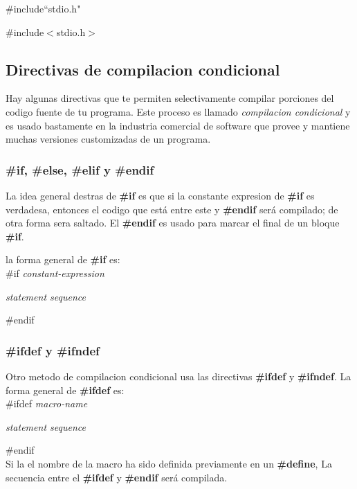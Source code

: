 \documentclass[]{article}
\begin{document}
			\#include``stdio.h"
			
			\#include$<$stdio.h$>$
			
		\subsection{Directivas de compilacion condicional}
		
		Hay algunas directivas que te permiten selectivamente compilar porciones del codigo fuente de tu programa. Este proceso es llamado \textit{compilacion condicional} y es usado bastamente en la industria comercial de software que provee y mantiene muchas versiones customizadas de un programa.
		
			\subsubsection{\#if, \#else, \#elif y \#endif}
			
			La idea general destras de \textbf{\#if} es que si la constante expresion de \textbf{\#if} es verdadesa, entonces el codigo que está entre este y \textbf{\#endif} será compilado; de otra forma sera saltado. El \textbf{\#endif} es usado para marcar el final de un bloque \textbf{\#if}.
			
			la forma general de \textbf{\#if} es:\\
			
				\#if \textit{constant-expression}
				
				\hspace{11pt}\textit{statement sequence}
				
				\#endif
				
			\subsubsection{\#ifdef y \#ifndef}
			
			Otro metodo de compilacion condicional usa las directivas \textbf{\#ifdef} y \textbf{\#ifndef}. La forma general de \textbf{\#ifdef} es:\\
			
				\#ifdef \textit{macro-name}
			
				\hspace{11pt}\textit{statement sequence}
				
				\#endif\\
			
			Si la el nombre de la macro ha sido definida previamente en un \textbf{\#define}, La secuencia entre el \textbf{\#ifdef} y \textbf{\#endif} será compilada.
			
\end{document}
